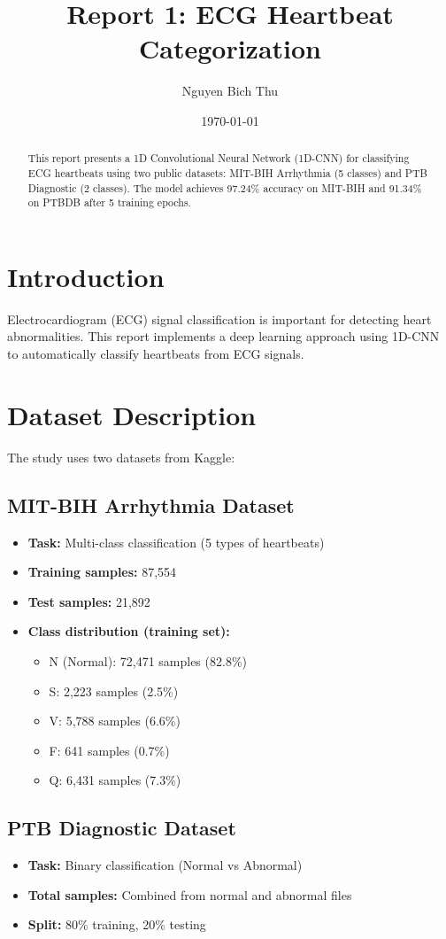 \documentclass{article}
\title{Report 1: ECG Heartbeat Categorization}
\author{Nguyen Bich Thu}
\date{\today}
\begin{document}
\maketitle

\begin{abstract}
This report presents a 1D Convolutional Neural Network (1D-CNN) for classifying ECG heartbeats using two public datasets: MIT-BIH Arrhythmia (5 classes) and PTB Diagnostic (2 classes). The model achieves 97.24\% accuracy on MIT-BIH and 91.34\% on PTBDB after 5 training epochs.
\end{abstract}

\section{Introduction}
Electrocardiogram (ECG) signal classification is important for detecting heart abnormalities. This report implements a deep learning approach using 1D-CNN to automatically classify heartbeats from ECG signals.

\section{Dataset Description}
The study uses two datasets from Kaggle:

\subsection{MIT-BIH Arrhythmia Dataset}
\begin{itemize}
    \item \textbf{Task:} Multi-class classification (5 types of heartbeats)
    \item \textbf{Training samples:} 87,554
    \item \textbf{Test samples:} 21,892
    \item \textbf{Class distribution (training set):}
    \begin{itemize}
        \item N (Normal): 72,471 samples (82.8\%)
        \item S: 2,223 samples (2.5\%)
        \item V: 5,788 samples (6.6\%)
        \item F: 641 samples (0.7\%)
        \item Q: 6,431 samples (7.3\%)
    \end{itemize}
\end{itemize}

\subsection{PTB Diagnostic Dataset}
\begin{itemize}
    \item \textbf{Task:} Binary classification (Normal vs Abnormal)
    \item \textbf{Total samples:} Combined from normal and abnormal files
    \item \textbf{Split:} 80\% training, 20\% testing
\end{itemize}
\end{document}
